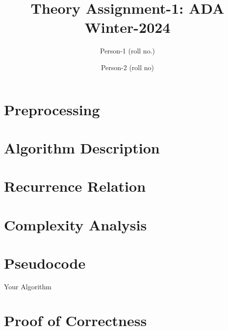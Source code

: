 \documentclass{article}
\title{Theory Assignment-1: ADA Winter-2024}
\author{Person-1 (roll no.) \and Person-2 (roll no)}
\date{}
\begin{document}
\maketitle

\section{Preprocessing}

\section{Algorithm Description}

\section{Recurrence Relation}

\section{Complexity Analysis}

\section{Pseudocode}
\begin{algorithm}
\caption{Your Algorithm}
\begin{algorithmic}[1]
    \EndFunction
\end{algorithmic}
\end{algorithm}

\section{Proof of Correctness}
\end{document}
